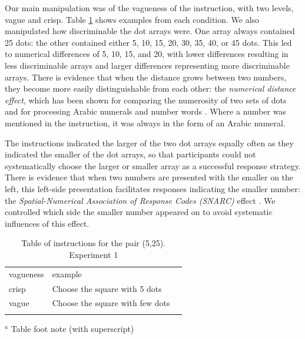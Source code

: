 \documentclass[graybox,envcountchap,sectrefs%
,footinfo
]{svmono}
\begin{document}
Our main manipulation was of the vagueness of the instruction, with two levels, vague and crisp. Table \ref{instructionse1} shows examples from each condition.  We also manipulated how discriminable the dot arrays were. One array always contained 25 dots: the other contained either 5, 10, 15, 20, 30, 35, 40, or 45 dots. This led to numerical differences of 5, 10, 15, and 20, with lower differences resulting in less discriminable arrays and larger differences representing more discriminable arrays. There is evidence that when the distance grows between two numbers, they become more easily distinguishable from each other: the \emph{numerical distance effect}, which has been shown for comparing the numerosity of two sets of dots \cite{van123} and for processing Arabic numerals and number words \cite{Dehaene199647}. Where a number was mentioned in the instruction, it was always in the form of an Arabic numeral.

The instructions indicated the larger of the two dot arrays equally often as they indicated the smaller of the dot arrays, so that participants could not systematically choose the larger or smaller array as a successful response strategy. There is evidence that when two numbers are presented with the smaller on the left, this left-side presentation facilitates responses indicating the smaller number: the \emph{Spatial-Numerical Association of Response Codes (SNARC)} effect \cite{dehaene1993mental, gevers2006automatic}. We controlled which side the smaller number appeared on to avoid systematic influences of this effect. 

\begin{table}
\caption{Table of instructions for the pair (5,25). Experiment 1}
\label{instructionse1} 
\begin{tabular}{lll}
\hline\noalign{\smallskip}
vagueness&example\\
\noalign{\smallskip}\svhline\noalign{\smallskip}
crisp 	& 	Choose the square with 5 dots \\
vague	&	Choose the square with few dots\\
\noalign{\smallskip}\hline\noalign{\smallskip}
\end{tabular}
$^a$ Table foot note (with superscript)\\
\end{table}
\end{document}
